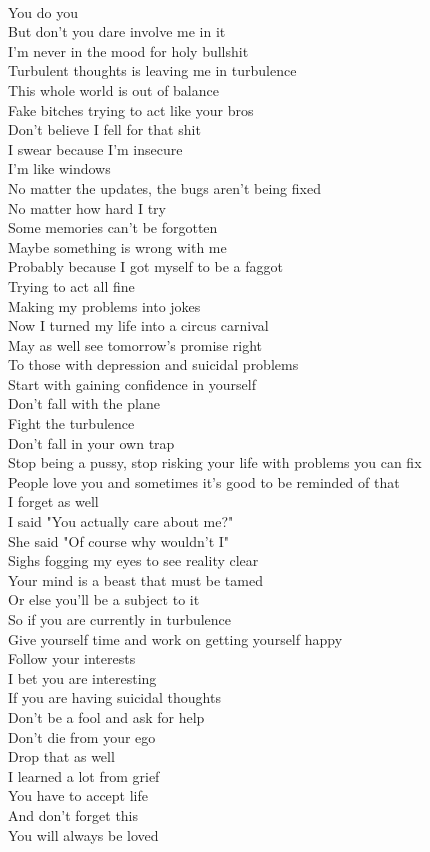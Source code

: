 \documentclass[12pt, b5paper]{article}
\begin{document}
\\You do you
\\But don't you dare involve me in it
\\I'm never in the mood for holy bullshit
\\Turbulent thoughts is leaving me in turbulence
\\This whole world is out of balance
\\Fake bitches trying to act like your bros
\\Don't believe I fell for that shit
\\I swear because I'm insecure
\\I'm like windows
\\No matter the updates, the bugs aren't being fixed
\\No matter how hard I try
\\Some memories can't be forgotten
\\Maybe something is wrong with me
\\Probably because I got myself to be a faggot
\\Trying to act all fine
\\Making my problems into jokes
\\Now I turned my life into a circus carnival
\\May as well see tomorrow's promise right
\\To those with depression and suicidal problems
\\Start with gaining confidence in yourself
\\Don't fall with the plane
\\Fight the turbulence
\\Don't fall in your own trap
\\Stop being a pussy, stop risking your life with problems you can fix
\\People love you and sometimes it's good to be reminded of that
\\I forget as well
\\I said "You actually care about me?"
\\She said "Of course why wouldn't I"
\\Sighs fogging my eyes to see reality clear
\\Your mind is a beast that must be tamed
\\Or else you'll be a subject to it
\\So if you are currently in turbulence
\\Give yourself time and work on getting yourself happy
\\Follow your interests
\\I bet you are interesting
\\If you are having suicidal thoughts
\\Don't be a fool and ask for help
\\Don't die from your ego
\\Drop that as well
\\I learned a lot from grief
\\You have to accept life
\\And don't forget this
\\You will always be loved
\newpage
\end{document}

